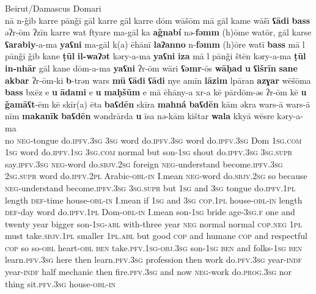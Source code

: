 \documentclass[output=paper]{langsci/langscibook}
\begin{document}
\ea
{Beirut/Damascus Domari}\\ \label{speech}
\gll nā n-ǧib karre pānǧī gāl karre gāl karre dōm wāšōm mā gāl kame wāšī \textbf{ʕādi} \textbf{bass} əʔr-ōm ʔzīn karre wat ftyare ma-gāl ka \textbf{aǧnabí} nə-\textbf{fəmm} (h)ōme watōr, gāl karse \textbf{ʕarabiy}{}-a-ma \textbf{yaʕni} ma-gāl k(a) ēhānī \textbf{laʔanno} n-\textbf{fəmm} (h)ōre watī \textbf{bass} mā l pānǧī ǧib kane \textbf{ṭūl} \textbf{il-waʔət} kəry-a-ma \textbf{yaʕni} \textbf{iza} mā l pānǧi štēn kəry-a-ma \textbf{ṭūl} \textbf{in-nhār} gāl kane dōm-a-ma \textbf{yaʕni} ʔr-ōm wāri \textbf{ʕəmr}-ōs \textbf{wāḥad} \textbf{u} \textbf{ʕišrīn} \textbf{sane} \textbf{akbar} ʔr-ōm-ki \textbf{b}{}-trən wars  \textbf{mū} \textbf{ʕādi} \textbf{ʕādi} nye amīn \textbf{lāzim} lpāran \textbf{azɣar} wēšōma \textbf{bass} bxēz e \textbf{u} \textbf{ādami} e \textbf{u} \textbf{maḥšūm} e mā ēhāny-a xr-a kē pārdōm-əs ʔr-ōm kē \textbf{u} \textbf{ǧamāʕt}-ēm kē skīr(a) ēta \textbf{baʕdēn} skīra \textbf{mahná} \textbf{baʕdēn} kām əkra wars-ā wars-ā nīm \textbf{makanīk} \textbf{baʕdēn} wəndrārda \textbf{u} īsa nə-kām kištar \textbf{wala} kkyā wēsre kəry-a-ma\\
no \textsc{neg}{}-tongue do\textsc{.ipfv.3sg} \textsc{3sg} word do.\textsc{ipfv.3sg} word do\textsc{.ipfv.3sg} Dom \textsc{1sg.com} \textsc{1sg} word do.\textsc{ipfv.1sg} \textsc{3sg.com} normal but son-\textsc{1sg} shout do\textsc{.ipfv.3sg} \textsc{3sg.supr} say.\textsc{ipfv.3sg} \textsc{neg}{}-word do.\textsc{sbjv.2sg} foreign \textsc{neg}{}-understand become.\textsc{ipfv.3sg} \textsc{2sg.supr} word do.\textsc{ipfv.2pl} Arabic-\textsc{obl-in} I.mean \textsc{neg}{}-word do.\textsc{sbjv.2sg} so because \textsc{neg}{}-understand become.\textsc{ipfv.3sg} \textsc{3sg.supr} but \textsc{1sg} and \textsc{3sg} tongue do.\textsc{ipfv.1pl} length \textsc{def}{}-time house-\textsc{obl-in} I.mean if \textsc{1sg} and \textsc{3sg} \textsc{cop.1pl} house-\textsc{obl-in} length \textsc{def}{}-day word do\textsc{.ipfv.1pl} Dom-\textsc{obl-in} I.mean son-\textsc{1sg} bride age-\textsc{3sg.f} one and twenty year bigger son-\textsc{1sg-abl} with-three year \textsc{neg} normal normal \textsc{cop.neg} \textsc{1pl} must take\textsc{.sbjv.1pl} smaller \textsc{1pl.abl} but good \textsc{cop} and humane \textsc{cop} and respectful \textsc{cop} so so-\textsc{obl} heart-\textsc{obl} \textsc{ben} take.\textsc{pfv}.\textsc{1sg-obj.3sg} son-\textsc{1sg} \textsc{ben} and folks-\textsc{1sg} \textsc{ben} learn.\textsc{pfv.3sg} here then learn.\textsc{pfv.3sg} profession then work do.\textsc{pfv.3sg} year-\textsc{indf} year-\textsc{indf} half mechanic then fire.\textsc{pfv.3sg} and now \textsc{neg}-work do.\textsc{prog.3sg} nor thing sit.\textsc{pfv.3sg} house-\textsc{obl-in}\\
\end{document}

